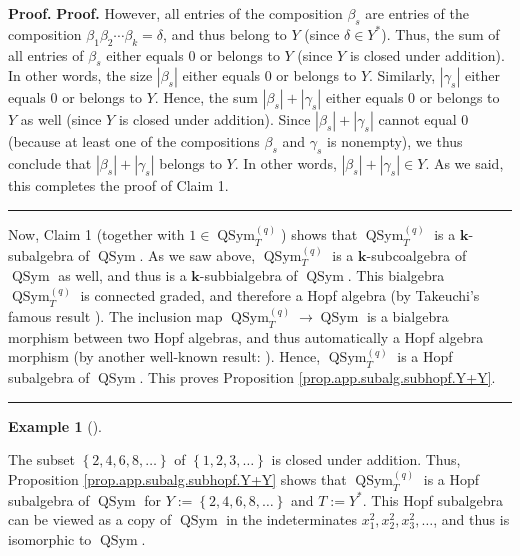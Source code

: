 \documentclass[numbers=enddot,12pt,final,onecolumn,notitlepage]{scrartcl}%
\theoremstyle{definition}
\newtheorem{exam}[theo]{Example}
\newenvironment{example}[1][]
{\begin{exam}[#1]\begin{leftbar}}
{\end{leftbar}\end{exam}}
\newenvironment{proof}[1][Proof]{\noindent\textbf{#1.} }{\ \rule{0.5em}{0.5em}}
\begin{document}
\begin{proof}
\begin{proof}
However, all entries of the composition $\beta_{s}$ are entries of the
composition $\beta_{1}\beta_{2}\cdots\beta_{k}=\delta$, and thus belong to $Y$
(since $\delta\in Y^{\ast}$). Thus, the sum of all entries of $\beta_{s}$
either equals $0$ or belongs to $Y$ (since $Y$ is closed under addition). In
other words, the size $\left\vert \beta_{s}\right\vert $ either equals $0$ or
belongs to $Y$. Similarly, $\left\vert \gamma_{s}\right\vert $ either equals
$0$ or belongs to $Y$. Hence, the sum $\left\vert \beta_{s}\right\vert
+\left\vert \gamma_{s}\right\vert $ either equals $0$ or belongs to $Y$ as
well (since $Y$ is closed under addition). Since $\left\vert \beta
_{s}\right\vert +\left\vert \gamma_{s}\right\vert $ cannot equal $0$ (because
at least one of the compositions $\beta_{s}$ and $\gamma_{s}$ is nonempty), we
thus conclude that $\left\vert \beta_{s}\right\vert +\left\vert \gamma
_{s}\right\vert $ belongs to $Y$. In other words, $\left\vert \beta
_{s}\right\vert +\left\vert \gamma_{s}\right\vert \in Y$. As we said, this
completes the proof of Claim 1.
\end{proof}

Now, Claim 1 (together with $1\in\operatorname*{QSym}\nolimits_{T}^{\left(
q\right)  }$) shows that $\operatorname*{QSym}\nolimits_{T}^{\left(  q\right)
}$ is a $\mathbf{k}$-subalgebra of $\operatorname*{QSym}$. As we saw above,
$\operatorname*{QSym}\nolimits_{T}^{\left(  q\right)  }$ is a $\mathbf{k}%
$-subcoalgebra of $\operatorname*{QSym}$ as well, and thus is a $\mathbf{k}%
$-subbialgebra of $\operatorname*{QSym}$. This bialgebra $\operatorname*{QSym}%
\nolimits_{T}^{\left(  q\right)  }$ is connected graded, and therefore a Hopf
algebra (by Takeuchi's famous result \cite[Proposition 1.4.16]{GriRei}). The
inclusion map $\operatorname*{QSym}\nolimits_{T}^{\left(  q\right)
}\rightarrow\operatorname*{QSym}$ is a bialgebra morphism between two Hopf
algebras, and thus automatically a Hopf algebra morphism (by another
well-known result: \cite[Corollary 1.4.27]{GriRei}). Hence,
$\operatorname*{QSym}\nolimits_{T}^{\left(  q\right)  }$ is a Hopf subalgebra
of $\operatorname*{QSym}$. This proves Proposition
\ref{prop.app.subalg.subhopf.Y+Y}.
\end{proof}

\begin{example}
The subset $\left\{  2,4,6,8,\ldots\right\}  $ of $\left\{  1,2,3,\ldots
\right\}  $ is closed under addition. Thus, Proposition
\ref{prop.app.subalg.subhopf.Y+Y} shows that $\operatorname*{QSym}%
\nolimits_{T}^{\left(  q\right)  }$ is a Hopf subalgebra of
$\operatorname*{QSym}$ for $Y:=\left\{  2,4,6,8,\ldots\right\}  $ and
$T:=Y^{\ast}$. This Hopf subalgebra can be viewed as a copy of
$\operatorname*{QSym}$ in the indeterminates $x_{1}^{2},x_{2}^{2},x_{3}%
^{2},\ldots$, and thus is isomorphic to $\operatorname*{QSym}$.
\end{example}
\end{document}
